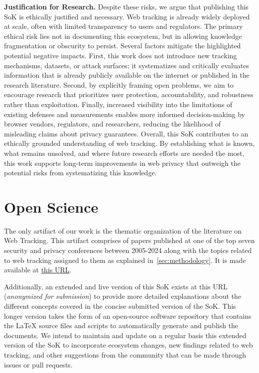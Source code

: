 \documentclass[letterpaper,twocolumn,10pt]{article}
\begin{document}
\noindent \textbf{Justification for Research.}
%
Despite these risks, we argue that publishing this SoK is ethically justified and necessary. 
%
Web tracking is already widely deployed at scale, often with limited transparency to users and regulators. 
%
The primary ethical risk lies not in documenting this ecosystem, but in allowing knowledge fragmentation or obscurity to persist. 
%
Several factors mitigate the highlighted potential negative impacts. 
%
First, this work does not introduce new tracking mechanisms, datasets, or attack surfaces; it systematizes and critically evaluates information that is already publicly available on the internet or published in the research literature. 
%
Second, by explicitly framing open problems, we aim to encourage research that prioritizes user protection, accountability, and robustness rather than exploitation. 
%
Finally, increased visibility into the limitations of existing defenses and measurements enables more informed decision-making by browser vendors, regulators, and researchers, reducing the likelihood of misleading claims about privacy guarantees. 
%
Overall, this SoK contributes to an ethically grounded understanding of web tracking. 
%
By establishing what is known, what remains unsolved, and where future research efforts are needed the most, this work supports long-term improvements in web privacy that outweigh the potential risks from systematizing this knowledge.

\section*{Open Science}
The only artifact of our work is the thematic organization of the literature on Web Tracking. This artifact comprises of papers published at one of the top seven security and privacy conferences between 2005-2024 along with the topics related to web tracking assigned to them as explained in~\autoref{sec:methodology}. It is made available at \href{https://osf.io/zsy7e/overview?view_only=a346b98bf89244b5b17d842f6fb3fb13}{this URL}.

Additionally, an extended and live version of this SoK exists at this URL (\textit{anonymized for submission}) to provide more detailed explanations about the different concepts covered in the concise submitted version of the SoK. This longer version takes the form of an open-source software repository that contains the \LaTeX{} source files and scripts to automatically generate and publish the documents. We intend to maintain and update on a regular basis this extended version of the SoK to incorporate ecosystem changes, new findings related to web tracking, and other suggestions from the community that can be made through issues or pull requests.



\appendix

\end{document}
